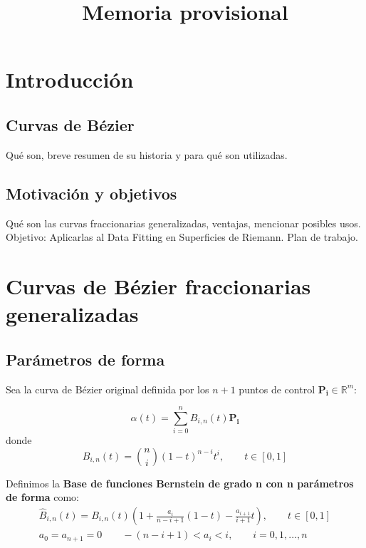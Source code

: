 \documentclass{article}
\title{Memoria provisional}
\newcommand{\R}{\mathbb{R}}
\begin{document}
\maketitle

\section{Introducción}

\subsection{Curvas de Bézier}
Qué son, breve resumen de su historia y para qué son utilizadas.

\subsection{Motivación y objetivos}
Qué son las curvas fraccionarias generalizadas, ventajas, mencionar posibles usos. Objetivo: Aplicarlas al Data Fitting en Superficies de Riemann. Plan de trabajo.










\section{Curvas de Bézier fraccionarias generalizadas}

\subsection{Parámetros de forma}

Sea la curva de Bézier original definida por los $n+1$ puntos de control $\mathbf{P_i} \in \R^m $:

\begin{equation*}
\alpha(t) = \sum_{i = 0}^{n}B_{i,n}(t)\mathbf{P_i}
\end{equation*}
donde
\begin{equation*}
B_{i,n}(t) = \binom{n}{i}(1-t)^{n-i}t^i, \qquad  t\in[0,1]
\end{equation*}



Definimos la \textbf{Base de funciones Bernstein de grado n con n parámetros de forma} como:
\begin{gather*}
\hat{B}_{i,n}(t) = B_{i,n}(t)(1 + \frac{a_i}{n-i+1}(1-t) -\frac{a_{i+1}}{i+1}t), \qquad t\in[0,1] \\
a_0 = a_{n+1} = 0 \qquad -(n-i+1) < a_i < i, \qquad  i=0,1,...,n
\end{gather*}
\end{document}
